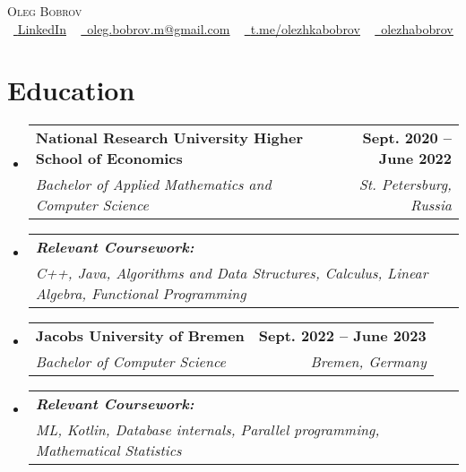 \documentclass[letterpaper,11pt]{article}
\makeatletter
\newcommand{\resumeSubheading}[4]{
  \vspace{-2pt}\item
    \begin{tabular*}{1.0\textwidth}[t]{l@{\extracolsep{\fill}}r}
      \textbf{#1} & \textbf{\large #2} \\
      \textit{\large#3} & \textit{\large #4} \\
    \end{tabular*}\vspace{-7pt}
}
\newcommand{\resumeSubHeadingListStart}{\begin{itemize}[leftmargin=0.0in, label={}]}
\newcommand{\resumeSubHeadingListEnd}{\end{itemize}}
\makeatother
\begin{document}

\begin{center}
    {\Huge \scshape Oleg Bobrov} \\ \vspace{1pt}
    \small \raisebox{-0.1\height}\faLinkedin\ \href{https://www.linkedin.com/in/oleg-bobrov-77a578210/}{  \underline{LinkedIn}} ~ \href{mailto:oleg.bobrov.m@gmail.com}{\raisebox{-0.2\height}\faEnvelope\  \underline{oleg.bobrov.m@gmail.com}} ~ 
    \href{https://t.me/olezhkabobrov//}{\raisebox{-0.2\height}\faTelegram\ \underline{t.me/olezhkabobrov}}  ~
    \href{https://github.com/olezhabobrov}{\raisebox{-0.2\height}\faGithub\ \underline{olezhabobrov}}
    \vspace{-8pt}
\end{center}


\section{Education}
  \resumeSubHeadingListStart
    \resumeSubheading
      {\large{National Research University Higher School of Economics}}{Sept. 2020 -- June 2022 }
      {\large{Bachelor of Applied Mathematics and Computer Science}}{St. Petersburg, Russia}
    \resumeSubheading
        {\quad \textit{Relevant Coursework:}}{}
        {\quad C++, Java, Algorithms and Data Structures,  Calculus, Linear Algebra, Functional Programming}{}
  
    \resumeSubheading
      {\large{Jacobs University of Bremen}}{Sept. 2022 -- June 2023 }
      {\large{Bachelor of Computer Science}}{Bremen, Germany}
    \resumeSubheading
        {\quad \textit{Relevant Coursework:}}{}
        {\quad ML, Kotlin, Database internals, Parallel programming, Mathematical Statistics}{}
  \resumeSubHeadingListEnd

 
\end{document}

